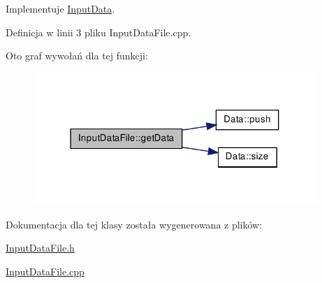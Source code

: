 \-Implementuje \hyperlink{class_input_data_ae1d8f8a2a2a7f7d4c4d3595ed767ef3d}{\-Input\-Data}.



\-Definicja w linii 3 pliku \-Input\-Data\-File.\-cpp.



\-Oto graf wywołań dla tej funkcji\-:\nopagebreak
\begin{figure}[H]
\begin{center}
\leavevmode
\includegraphics[width=304pt]{class_input_data_file_acdd212448e3fcd8bc6653e0c9a2fadfb_cgraph}
\end{center}
\end{figure}




\-Dokumentacja dla tej klasy została wygenerowana z plików\-:\begin{DoxyCompactItemize}
\item 
\hyperlink{_input_data_file_8h}{\-Input\-Data\-File.\-h}\item 
\hyperlink{_input_data_file_8cpp}{\-Input\-Data\-File.\-cpp}\end{DoxyCompactItemize}
